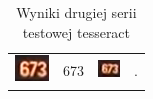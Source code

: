 \begin{table}[h!]
\begin{tabular}{c l c l}
    \\ 

    \begin{minipage}{.2\textwidth}
      \includegraphics[width=\textwidth]{img/exp_number_n03}
    \end{minipage}
    &
    673
    &
    \begin{minipage}{.2\textwidth}
      \includegraphics[width=\textwidth]{img/exp_number_n04}
    \end{minipage}
    &
    .

    \\ 

  \end{tabular}
  \caption{Wyniki drugiej serii testowej tesseract}\label{tbl:tess_02}
\end{table}

